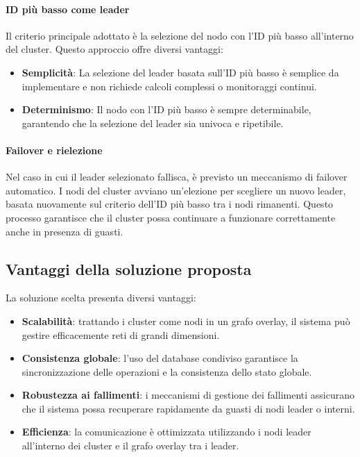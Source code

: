 \documentclass[12pt, a4paper]{report}
\begin{document}
\paragraph{ID pi\`u basso come leader}
Il criterio principale adottato \`e la selezione del nodo con l'ID pi\`u basso all'interno del cluster. Questo approccio offre diversi vantaggi:
\begin{itemize}
    \item \textbf{Semplicit\`a}: La selezione del leader basata sull'ID pi\`u basso \`e semplice da implementare e non richiede calcoli complessi o monitoraggi continui.
    \item \textbf{Determinismo}: Il nodo con l'ID pi\`u basso \`e sempre determinabile, garantendo che la selezione del leader sia univoca e ripetibile.
\end{itemize}

\paragraph{Failover e rielezione}
Nel caso in cui il leader selezionato fallisca, \`e previsto un meccanismo di failover automatico. I nodi del cluster avviano un'elezione per scegliere un nuovo leader, basata nuovamente sul criterio dell'ID pi\`u basso tra i nodi rimanenti. Questo processo garantisce che il cluster possa continuare a funzionare correttamente anche in presenza di guasti.



\newpage
\subsection{Vantaggi della soluzione proposta}

La soluzione scelta presenta diversi vantaggi:

\begin{itemize}
    \item \textbf{Scalabilit\`a}: trattando i cluster come nodi in un grafo overlay, il sistema pu\`o gestire efficacemente reti di grandi dimensioni.
    \item \textbf{Consistenza globale}: l'uso del database condiviso garantisce la sincronizzazione delle operazioni e la consistenza dello stato globale.
    \item \textbf{Robustezza ai fallimenti}: i meccanismi di gestione dei fallimenti assicurano che il sistema possa recuperare rapidamente da guasti di nodi leader o interni.
    \item \textbf{Efficienza}: la comunicazione \`e ottimizzata utilizzando i nodi leader all'interno dei cluster e il grafo overlay tra i leader.
\end{itemize}
\end{document}
